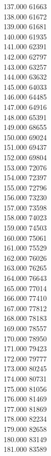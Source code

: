{ 137.000	61663 \\
 138.000	61672 \\
 139.000	61681 \\
 140.000	61935 \\
 141.000	62391 \\
 142.000	62797 \\
 143.000	63257 \\
 144.000	63632 \\
 145.000	64033 \\
 146.000	64485 \\
 147.000	64916 \\
 148.000	65391 \\
 149.000	68655 \\
 150.000	69024 \\
 151.000	69437 \\
 152.000	69804 \\
 153.000	72076 \\
 154.000	72397 \\
 155.000	72796 \\
 156.000	73230 \\
 157.000	73598 \\
 158.000	74023 \\
 159.000	74503 \\
 160.000	75061 \\
 161.000	75529 \\
 162.000	76026 \\
 163.000	76265 \\
 164.000	76643 \\
 165.000	77014 \\
 166.000	77410 \\
 167.000	77812 \\
 168.000	78183 \\
 169.000	78557 \\
 170.000	78950 \\
 171.000	79423 \\
 172.000	79777 \\
 173.000	80245 \\
 174.000	80731 \\
 175.000	81056 \\
 176.000	81469 \\
 177.000	81869 \\
 178.000	82234 \\
 179.000	82658 \\
 180.000	83149 \\
 181.000	83589 \\
}
